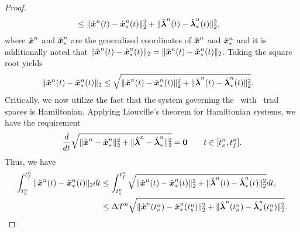 \begin{proof}
\begin{align*}
&\le  \| \hat{ \boldsymbol x}^{n}(t) - \hat{ \boldsymbol x}_{*}^{n}(t) \|_2^2 + \|  \hat{\boldsymbol \lambda}^{n}(t) - 
 \hat{\boldsymbol \lambda}_*^{n}(t)  \|_2^2, 
\end{align*}
where $\hat{ \boldsymbol x}^{n}$ and $\hat{ \boldsymbol x}_{*}^{n}$ are the generalized coordinates of $\tilde{\boldsymbol x}^{n}$ and $\tilde{\boldsymbol x}_{*}^{n}$ and it is additionally noted that 
$\| \hat{ \boldsymbol x}^{n}(t) - \hat{ \boldsymbol x}_{*}^{n}(t) \|_2 = 
 \| \tilde{\boldsymbol x}^{n}(t) - \tilde{\boldsymbol x}_{*}^{n}(t) \|_2$. Taking the square root yields
\begin{align*}
\| \tilde{\boldsymbol x}^{n}(t) - \tilde{\boldsymbol x}_{*}^{n}(t) \|_2 &\le \sqrt{ \| \hat{ \boldsymbol x}^{n}(t) - \hat{ \boldsymbol x}_{*}^{n}(t) \|_2^2 + \|  \hat{\boldsymbol \lambda}^{n}(t) - 
 \hat{\boldsymbol \lambda}_*^{n}(t)  \|_2^2}. 
\end{align*}
Critically, we now utilize the fact that the system governing the \methodAcronymROM\ with \spatialAcronym\ trial spaces is Hamiltonian. 
Applying Liouville's theorem for Hamiltonian systems, we have the requirement 
$$ \frac{d}{dt}  \sqrt{ \| \hat{ \boldsymbol x}^{n} - \hat{ \boldsymbol x}_{*}^{n} \|_2^2 + \| \hat{\boldsymbol \lambda}^{n} - 
\hat{\boldsymbol \lambda}_*^{n}  \|_2^2}  = \boldsymbol 0 \qquad t \in [t_s^{n},t_f^{n}].$$
Thus, we have
\begin{align*}
\int_{t_s^{n}}^{t_f^{n}} \| \tilde{\boldsymbol x}^{n}(t) - \tilde{\boldsymbol x}_{*}^{n}(t) \|_2 dt &\le 
\int_{t_s^{n}}^{t_f^{n}} \sqrt{ \| \hat{ \boldsymbol x}^{n}(t) - \hat{ \boldsymbol x}_{*}^{n}(t) \|_2^2 + \|  \hat{\boldsymbol \lambda}^{n}(t) - 
 \hat{\boldsymbol \lambda}_*^{n}(t)  \|_2^2 } dt, \\
&\le  \Delta T^{n}  \sqrt{ \| \hat{ \boldsymbol x}^{n}(t_s^{n}) - \hat{ \boldsymbol x}_{*}^{n}(t_s^{n} ) \|_2^2 + \| \hat{\boldsymbol \lambda}^{n}(t_s^{n}) - 
\hat{\boldsymbol \lambda}_*^{n}(t_s^{n})   \|_2^2}.
\end{align*}

\end{proof}
